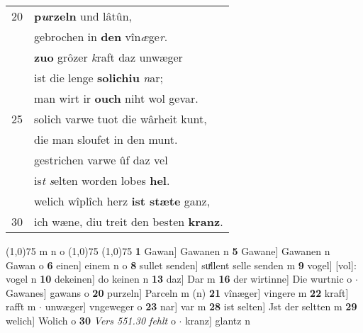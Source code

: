 \documentclass[8pt,a4paper,notitlepage]{article}
\begin{document}
\begin{table}[ht]
\begin{minipage}[t]{0.5\linewidth}
\begin{tabular}{rl}
20 & \textbf{p\textit{u}rzeln} und lâtûn,\\ 
 & gebrochen in \textbf{den} vîn\textit{æ}ge\textit{r}.\\ 
 & \textbf{zuo} grôzer \textit{k}raft daz unwæger\\ 
 & ist die lenge \textbf{solichiu} \textit{n}ar;\\ 
 & man wirt ir \textbf{ouch} niht wol gevar.\\ 
25 & solich varwe tuot die wârheit kunt,\\ 
 & die man sloufet in den munt.\\ 
 & gestrichen varwe ûf daz vel\\ 
 & is\textit{t} \textit{s}elten worden lobes \textbf{hel}.\\ 
 & welich wîplîch herz \textbf{ist stæte} ganz,\\ 
30 & ich wæne, diu treit den besten \textbf{kranz}.\\ 
\end{tabular}
\scriptsize
\line(1,0){75} \newline
m n o \newline
\line(1,0){75} \newline
\newline
\line(1,0){75} \newline
\textbf{1} Gawan] Gawanen n \textbf{5} Gawane] Gawanen n Gawan o \textbf{6} einen] einem n o \textbf{8} sullet senden] suͯllent selle senden m \textbf{9} vogel] [vol]: vogel n \textbf{10} dekeinen] do keinen n \textbf{13} daz] Dar m \textbf{16} der wirtinne] Die wurtnic o  $\cdot$ Gawanes] gawans o \textbf{20} purzeln] Parceln m (n) \textbf{21} vînæger] vingere m \textbf{22} kraft] rafft m  $\cdot$ unwæger] vngeweger o \textbf{23} nar] var m \textbf{28} ist selten] Jst der seltten m \textbf{29} welich] Wolich o \textbf{30} \textit{Vers 551.30 fehlt} o   $\cdot$ kranz] glantz n \newline
\end{minipage}
\end{table}
\newpage
\end{document}
